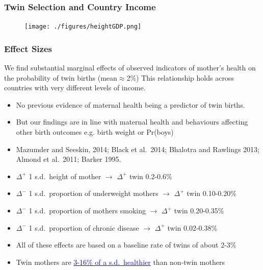 \documentclass[9pt,letterpaper,subeqn]{beamer}
\begin{document}
\begin{frame}[label=Spain2]

\end{frame}

\begin{frame}[label=HealthGDP]
\frametitle{Twin Selection and Country Income}
\begin{figure}[htpb!]
\centering
  \texttt{[image: ./figures/heightGDP.png]}
\end{figure}
\hyperlink{EducGDP}{}
\end{frame}



\begin{frame}[label=effects]
\frametitle{Effect Sizes}
We find substantial marginal effects of observed indicators of mother’s health on the probability of twin births (mean$\approx$2\%)
This relationship holds across countries with very different levels of income.
\begin{itemize}
\item No previous evidence of maternal health being a predictor of twin births.
\item But our findings are in line with maternal health and behaviours affecting other birth outcomes e.g. birth weight or Pr(boys) 
\item Mazumder and Seeskin, 2014; Black et al.\ 2014;  Bhalotra and Rawlings 2013; Almond et al.\ 2011; Barker 1995.
  \item $\Delta^+$ 1 s.d.\ height of mother $\rightarrow$ $\Delta^+$ twin 0.2-0.6\% 
  \item $\Delta^-$ 1 s.d.\ proportion of underweight mothers $\rightarrow$ $\Delta^+$ twin 0.10-0.20\%
  \item $\Delta^-$ 1 s.d.\ proportion of mothers smoking $\rightarrow$ $\Delta^+$ twin 0.20-0.35\%
  \item $\Delta^-$ 1 s.d.\ proportion of chronic disease $\rightarrow$ $\Delta^+$ twin 0.02-0.38\%
  \item All of these effects are based on a baseline rate of twins of about 2-3\%
  \item Twin mothers are \hyperlink{factors}{\textcolor{blue}{3-16\% of a s.d.\ healthier}} than non-twin mothers 
\end{itemize}
\end{frame}
\end{document}
